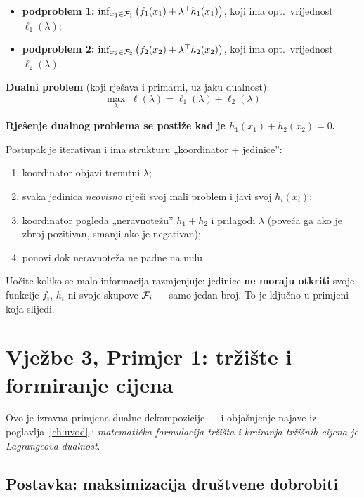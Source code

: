 \begin{itemize}
  \item \textbf{podproblem 1:}
        $\inf_{x_1\in\mathcal{F}_1}\big(f_1(x_1) + \lambda^{\top} h_1(x_1)\big)$,
        koji ima opt.\ vrijednost $\ell_1(\lambda)$;
  \item \textbf{podproblem 2:}
        $\inf_{x_2\in\mathcal{F}_2}\big(f_2(x_2) + \lambda^{\top} h_2(x_2)\big)$,
        koji ima opt.\ vrijednost $\ell_2(\lambda)$.
\end{itemize}

\textbf{Dualni problem} (koji rješava i primarni, uz jaku dualnost):
\[
\max_\lambda\; \ell(\lambda) = \ell_1(\lambda) + \ell_2(\lambda)
\]

\textbf{Rješenje dualnog problema se postiže kad je $h_1(x_1) + h_2(x_2) = 0$.}

\begin{napomena}
Postupak je iterativan i ima strukturu „koordinator + jedinice”:
\begin{enumerate}
  \item koordinator objavi trenutni $\lambda$;
  \item svaka jedinica \emph{neovisno} riješi svoj mali problem i javi svoj
        $h_i(x_i)$;
  \item koordinator pogleda „neravnotežu” $h_1 + h_2$ i prilagodi $\lambda$
        (poveća ga ako je zbroj pozitivan, smanji ako je negativan);
  \item ponovi dok neravnoteža ne padne na nulu.
\end{enumerate}
Uočite koliko se malo informacija razmjenjuje: jedinice \textbf{ne moraju
otkriti} svoje funkcije $f_i$, $h_i$ ni svoje skupove $\mathcal{F}_i$ --- samo jedan
broj. To je ključno u primjeni koja slijedi.
\end{napomena}

\section{Vježbe 3, Primjer 1: tržište i formiranje cijena}
\label{sec:trziste}

Ovo je izravna primjena dualne dekompozicije --- i objašnjenje najave iz
poglavlja~\ref{ch:uvod} : \emph{matematička formulacija tržišta i
kreiranja tržišnih cijena je Lagrangeova dualnost}.

\subsection{Postavka: maksimizacija društvene dobrobiti}

